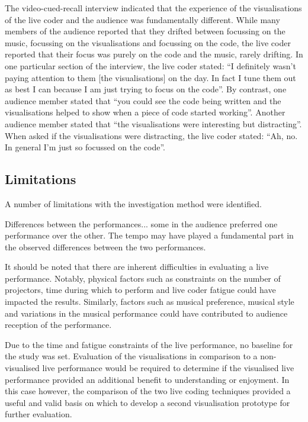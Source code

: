 The video-cued-recall interview indicated that the experience of the visualisations of the live coder and the audience was fundamentally different. While many members of the audience reported that they drifted between focussing on the music, focussing on the visualisations and focussing on the code, the live coder reported that their focus was purely on the code and the music, rarely drifting. In one particular section of the interview, the live coder stated: ``I definitely wasn't paying attention to them [the visualisations] on the day. In fact I tune them out as best I can because I am just trying to focus on the code''. By contrast, one audience member stated that ``you could see the code being written and the visualisations helped to show when a piece of code started working''. Another audience member stated that ``the visualisations were interesting but distracting''. When asked if the visualisations were distracting, the live coder stated: ``Ah, no. In general I'm just so focussed on the code''.



\subsection{Limitations}

A number of limitations with the investigation method were identified. 

Differences between the performances... some in the audience preferred one performance over the other. The tempo may have played a fundamental part in the observed differences between the two performances.

It should be noted that there are inherent difficulties in evaluating a live performance. Notably, physical factors such as constraints on the number of projectors, time during which to perform and live coder fatigue could have impacted the results. Similarly, factors such as musical preference, musical style and variations in the musical performance could have contributed to audience reception of the performance. 

Due to the time and fatigue constraints of the live performance, no baseline for the study was set. Evaluation of the visualisations in comparison to a non-visualised live performance would be required to determine if the visualised live performance provided an additional benefit to understanding or enjoyment. In this case however, the comparison of the two live coding techniques provided a useful and valid basis on which to develop a second visualisation prototype for further evaluation.

